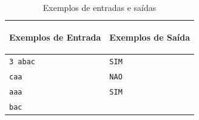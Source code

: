 \begin{table}[h]
    \centering
    \begin{tabular}{|p{7cm}|p{7cm}|}
       \hline
        \begin{center}
            \vspace{-0.3cm}
            \textbf{Exemplos de Entrada}
            \vspace{-0.3cm}
        \end{center} 
         &  
        \begin{center}
            \vspace{-0.3cm}
            \textbf{Exemplos de Saída}
            \vspace{-0.3cm}
        \end{center} \\ \hline
         \texttt{3 abac} & \texttt{SIM} \\  
         \texttt{caa} & \texttt{NAO} \\
         \texttt{aaa} & \texttt{SIM} \\  
         \texttt{bac} & \\
         \hline
    \end{tabular}
    \caption{Exemplos de entradas e saídas}
    \label{tab:inputB}
\end{table}

\newpage

\begin{center}
\noindent

\end{center}